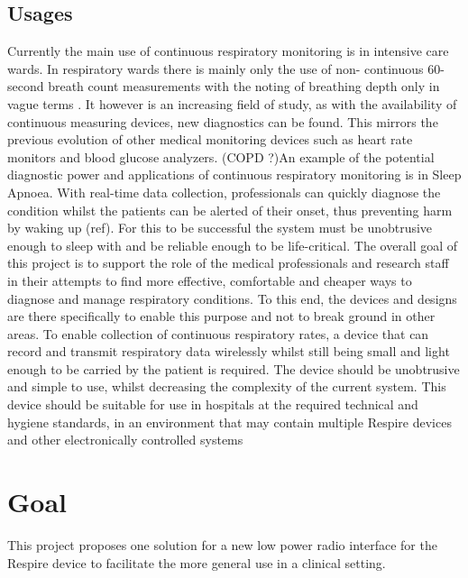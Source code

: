 \subsection{Usages}
Currently the main use of continuous respiratory monitoring is in intensive
care wards. In respiratory wards there is mainly only the use of non-
continuous 60-second breath count measurements with the noting of
breathing depth only in vague terms \cite{Hunter2008}. It however is an
increasing field of study, as with the availability of continuous measuring
devices, new diagnostics can be found. This mirrors the previous evolution of other medical
monitoring devices such as heart rate monitors and blood glucose analyzers.
(COPD ?)An example of the potential diagnostic power and applications of continuous respiratory
monitoring is in Sleep Apnoea. With real-time data collection, professionals can quickly diagnose the
condition whilst the patients can be alerted of their onset, thus preventing harm by waking up (ref).
For this to be successful the system must be unobtrusive enough to
sleep with and be reliable enough to be life-critical.
The overall goal of this project is to support the role of the medical
professionals and research staff in their attempts to find more
effective, comfortable and cheaper ways to diagnose and manage
respiratory conditions. To this end, the devices and designs are there specifically to enable this
purpose and not to break ground in other areas.
To enable collection of continuous respiratory rates, a device that can record and transmit
respiratory data wirelessly whilst still being small and light enough to be carried by the patient is
required. The device should be unobtrusive and simple to use, whilst decreasing the complexity of
the current system. This device should be suitable for use in hospitals at the required technical and
hygiene standards, in an environment that may contain multiple Respire devices and other
electronically controlled systems

\section{Goal}
This project proposes one solution for a new low power radio interface for the Respire device to
facilitate the more general use in a clinical setting.


